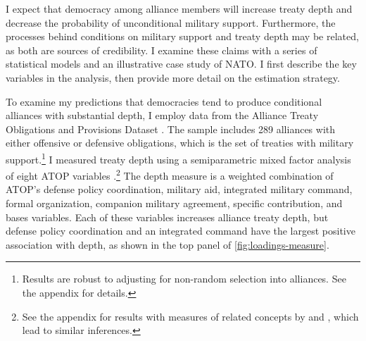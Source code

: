\documentclass[12pt]{article}
\begin{document}
 
I expect that democracy among alliance members will increase treaty depth and decrease the probability of unconditional military support. 
Furthermore, the processes behind conditions on military support and treaty depth may be related, as both are sources of credibility. 
I examine these claims with a series of statistical models and an illustrative case study of NATO. 
I first describe the key variables in the analysis, then provide more detail on the estimation strategy. 


To examine my predictions that democracies tend to produce conditional alliances with substantial depth, I employ data from the Alliance Treaty Obligations and Provisions Dataset \citep{Leedsetal2002}. 
The sample includes 289 alliances with either offensive or defensive obligations, which is the set of treaties with military support.\footnote{Results are robust to adjusting for non-random selection into alliances. See the appendix for details.} 
I measured treaty depth using a semiparametric mixed factor analysis of eight ATOP variables \citep{Murrayetal2013}.\footnote{See the appendix for results with measures of related concepts by \citet{LeedsAnac2005} and \citet{BensonClinton2016}, which lead to similar inferences.}
The depth measure is a weighted combination of ATOP's defense policy coordination, military aid, integrated military command, formal organization, companion military agreement, specific contribution, and bases variables. 
Each of these variables increases alliance treaty depth, but defense policy coordination and an integrated command have the largest positive association with depth, as shown in the top panel of \autoref{fig:loadings-measure}. 
\end{document}
